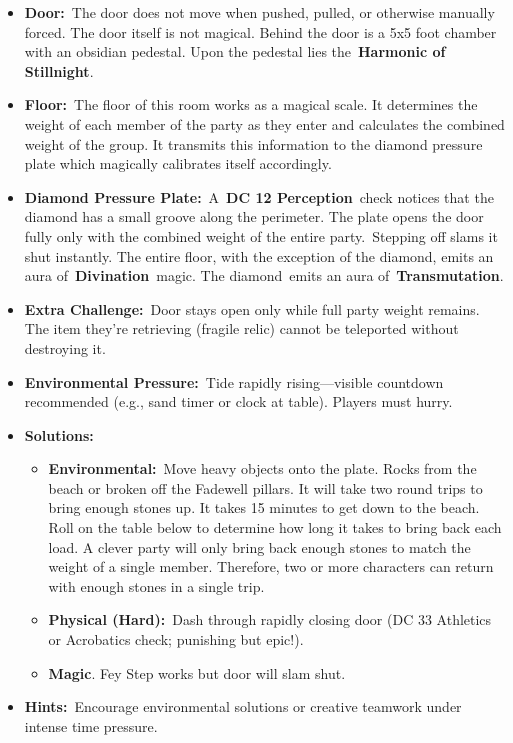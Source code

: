 \documentclass[10pt,twocolumn]{article}
\let\oldtextbf\textbf
\renewcommand{\textbf}[1]{\oldtextbf{{#1}}}
\providecommand{\tightlist}{
  \setlength{\itemsep}{4pt}
  \setlength{\topsep}{0pt}
  \setlength{\parsep}{0pt}
  \setlength{\parskip}{0pt}
  \setlength{\partopsep}{0pt}
}
\begin{document}
\begin{itemize}
\tightlist
\item
  \textbf{Door:}~The door does not move when pushed, pulled, or
  otherwise manually forced. The door itself is not magical. Behind the
  door is a 5x5 foot chamber with an obsidian pedestal. Upon the
  pedestal lies the~\textbf{Harmonic of Stillnight}.
\item
  \textbf{Floor:}~The floor of this room works as a magical scale. It
  determines the weight of each member of the party as they enter and
  calculates the combined weight of the group. It transmits this
  information to the diamond pressure plate which magically calibrates
  itself accordingly.
\item
  \textbf{Diamond Pressure Plate:}~A~\textbf{DC 12 Perception}~check
  notices that the diamond has a small groove along the perimeter. The
  plate opens the door fully only with the combined weight of the entire
  party.~Stepping off slams it shut instantly. The entire floor, with
  the exception of the diamond, emits an aura
  of~\textbf{Divination}~magic. The diamond~emits an aura
  of~\textbf{Transmutation}.
\item
  \textbf{Extra Challenge:}~Door stays open only while full party weight
  remains. The item they're retrieving (fragile relic) cannot be
  teleported without destroying it.
\item
  \textbf{Environmental Pressure:}~Tide rapidly rising---visible
  countdown recommended (e.g., sand timer or clock at table). Players
  must hurry.
\item
  \textbf{Solutions:}

  \begin{itemize}
  \tightlist
  \item
    \textbf{Environmental:}~Move heavy objects onto the plate. Rocks
    from the beach or broken off the Fadewell pillars. It will take two
    round trips to bring enough stones up. It takes 15 minutes to get
    down to the beach. Roll on the table below to determine how long it
    takes to bring back each load. A clever party will only bring back
    enough stones to match the weight of a single member. Therefore, two
    or more characters can return with enough stones in a single trip.
  \item
    \textbf{Physical (Hard):}~Dash through rapidly closing door (DC 33
    Athletics or Acrobatics check; punishing but epic!).
  \item
    \textbf{Magic}. Fey Step works but door will slam shut.~
  \end{itemize}
\item
  \textbf{Hints:}~Encourage environmental solutions or creative teamwork
  under intense time pressure.
\end{itemize}
\end{document}
